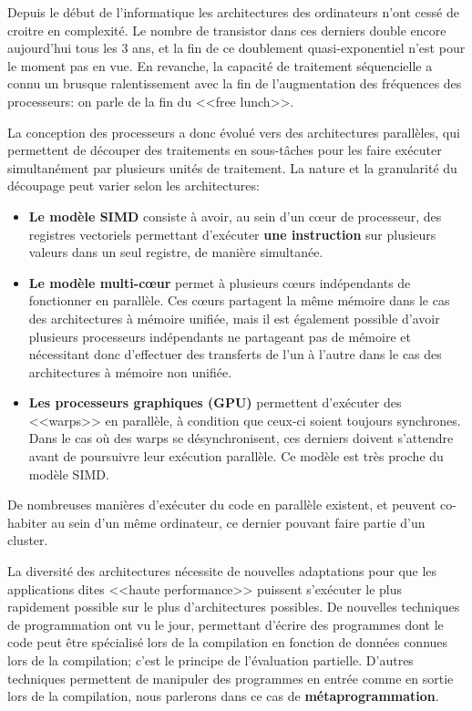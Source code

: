 \documentclass[main]{subfiles}
\begin{document}
Depuis le d\'ebut de l'informatique les architectures des ordinateurs n'ont
cess\'e de croitre en complexit\'e. Le nombre de transistor dans ces derniers
double encore aujourd'hui tous les 3 ans, et la fin de ce doublement
quasi-exponentiel n'est pour le moment pas en vue.
En revanche, la capacit\'e de traitement s\'equencielle a connu un brusque
ralentissement avec la fin de l'augmentation des fr\'equences des processeurs:
on parle de la fin du <<free lunch>>.

La conception des processeurs a donc \'evolu\'e vers des architectures
parall\`eles, qui permettent de d\'ecouper des traitements en sous-t\^aches
pour les faire ex\'ecuter simultan\'ement par plusieurs unit\'es de traitement.
La nature et la granularit\'e du d\'ecoupage peut varier selon les
architectures:

\begin{itemize}
\item
\textbf{Le mod\`ele SIMD} consiste \`a avoir, au sein d'un c\oe{}ur de
processeur, des registres vectoriels permettant d'ex\'ecuter
\textbf{une instruction} sur plusieurs valeurs dans un seul registre,
de mani\`ere simultan\'ee.

\item
\textbf{Le mod\`ele multi-c\oe{}ur} permet \`a plusieurs c\oe{}urs ind\'ependants de
fonctionner en parall\`ele. Ces c\oe{}urs partagent la m\^eme m\'emoire dans le
cas des architectures \`a m\'emoire unifi\'ee, mais il est \'egalement possible
d'avoir plusieurs processeurs ind\'ependants ne partageant pas de m\'emoire
et n\'ecessitant donc d'effectuer des transferts de l'un \`a l'autre dans le cas
des architectures \`a m\'emoire non unifi\'ee.

\item
\textbf{Les processeurs graphiques (GPU)} permettent d'ex\'ecuter des <<warps>> en
parall\`ele, \`a condition que ceux-ci soient toujours synchrones. Dans le cas
o\`u des warps se d\'esynchronisent, ces derniers doivent s'attendre avant de
poursuivre leur ex\'ecution parall\`ele. Ce mod\`ele est tr\`es proche
du mod\`ele SIMD.
\end{itemize}

De nombreuses mani\`eres d'ex\'ecuter du code en parall\`ele existent,
et peuvent co-habiter au sein d'un m\^eme ordinateur, ce dernier pouvant faire
partie d'un cluster.

La diversit\'e des architectures n\'ecessite de nouvelles adaptations pour que
les applications dites <<haute performance>> puissent s'ex\'ecuter
le plus rapidement possible sur le plus d'architectures possibles.
De nouvelles techniques de programmation ont vu le jour, permettant d'\'ecrire
des programmes dont le code peut \^etre sp\'ecialis\'e lors de la compilation
en fonction de donn\'ees connues lors de la compilation;
c'est le principe de l'\'evaluation partielle. D'autres techniques permettent
de manipuler des programmes en entr\'ee comme en sortie lors de la compilation,
nous parlerons dans ce cas de \textbf{m\'etaprogrammation}.
\end{document}

